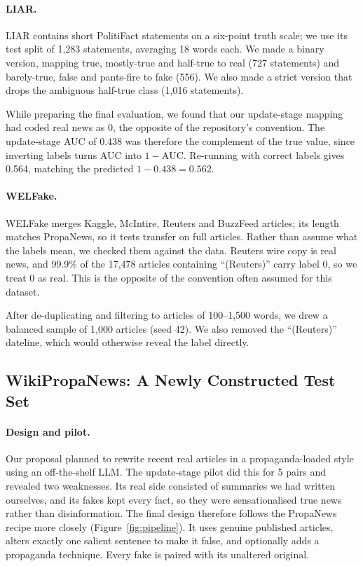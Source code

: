 \documentclass[11pt]{article}
\begin{document}
\paragraph{LIAR.} LIAR \citep{wang2017liar} contains short PolitiFact statements on a six-point truth scale; we use its test split of 1,283 statements, averaging 18 words each. We made a binary version, mapping true, mostly-true and half-true to real (727 statements) and barely-true, false and pants-fire to fake (556). We also made a strict version that drops the ambiguous half-true class (1,016 statements).

While preparing the final evaluation, we found that our update-stage mapping had coded real news as 0, the opposite of the repository's convention. The update-stage AUC of 0.438 was therefore the complement of the true value, since inverting labels turns AUC into $1-\text{AUC}$. Re-running with correct labels gives 0.564, matching the predicted $1-0.438=0.562$.

\paragraph{WELFake.} WELFake \citep{verma2021welfake} merges Kaggle, McIntire, Reuters and BuzzFeed articles; its length matches PropaNews, so it tests transfer on full articles. Rather than assume what the labels mean, we checked them against the data. Reuters wire copy is real news, and 99.9\% of the 17,478 articles containing ``(Reuters)'' carry label 0, so we treat 0 as real. This is the opposite of the convention often assumed for this dataset.

After de-duplicating and filtering to articles of 100--1,500 words, we drew a balanced sample of 1,000 articles (seed 42). We also removed the ``(Reuters)'' dateline, which would otherwise reveal the label directly.

\subsection{WikiPropaNews: A Newly Constructed Test Set}

\paragraph{Design and pilot.} Our proposal planned to rewrite recent real articles in a propaganda-loaded style using an off-the-shelf LLM. The update-stage pilot did this for 5 pairs and revealed two weaknesses. Its real side consisted of summaries we had written ourselves, and its fakes kept every fact, so they were sensationalised true news rather than disinformation. The final design therefore follows the PropaNews recipe more closely (Figure~\ref{fig:pipeline}). It uses genuine published articles, alters exactly one salient sentence to make it false, and optionally adds a propaganda technique. Every fake is paired with its unaltered original.
\end{document}
